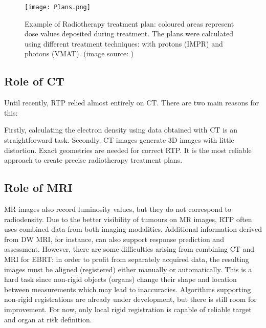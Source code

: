 \begin{figure}[!tbh]
	\centering
	\texttt{[image: Plans.png]}
	\caption{Example of Radiotherapy treatment plan: coloured areas represent dose values deposited during treatment. The plans were calculated using different treatment techniques: with protons (IMPR) and photons (VMAT). (image source: \cite{piotr})}
	\label{fig:plan}
\end{figure}

\clearpage



\subsection{Role of CT}

Until recently, RTP relied almost entirely on CT.
There are two main reasons for this:

Firstly, calculating the electron density using data obtained with CT is an straightforward task.
Secondly, CT images generate 3D images with little distortion. Exact geometries are needed for correct RTP.
It is the most reliable approach to create precise radiotherapy treatment plans. \cite{Constantinou2012, Schneider1996}

\subsection{Role of MRI}
MR images also record luminosity values, but they do not correspond to radiodensity.
Due to the better visibility of tumours on MR images, RTP often uses combined data from both imaging modalities.
Additional information derived from DW MRI, for instance, can also support response prediction and assessment.
However, there are some difficulties arising from combining CT and MRI for EBRT:
in order to profit from separately acquired data, the resulting images must be aligned (registered) either manually or automatically.
This is a hard task since non-rigid objects (organs) change their shape and location between measurements which may lead to inaccuracies.
Algorithms supporting non-rigid registrations are already under development, but there is still room for improvement.
For now, only local rigid registration is capable of reliable target and organ at risk definition.

